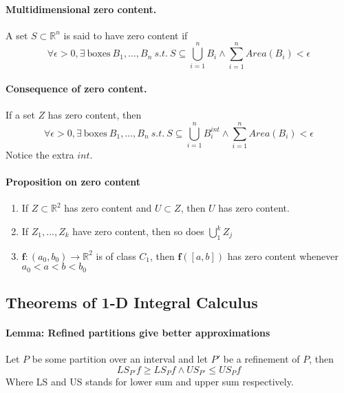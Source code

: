 \documentclass[11pt]{article}
\newcommand{\real}[0]{\mathbb{R}}
\begin{document}
\paragraph{Multidimensional zero content.} A set $S\subset \real^n$ is said to have zero content if
\begin{equation*}
    \forall \epsilon > 0, \exists~\text{boxes}~B_1,...,B_n~s.t.~S\subseteq \bigcup_{i=1}^{n}B_i \wedge \sum_{i=1}^{n}{Area(B_i)} < \epsilon
\end{equation*}

\paragraph{Consequence of zero content.}If a set $Z$ has zero content, then
\begin{equation*}
    \forall \epsilon>0, \exists~\text{boxes}~B_1,...,B_n~s.t.~ S\subseteq \bigcup_{i=1}^{n}B^{int}_i \wedge \sum_{i=1}^{n}{Area(B_i)} < \epsilon
\end{equation*}
Notice the extra $int$.

\paragraph{Proposition on zero content} 
\begin{enumerate}
    \item If $Z\subset \real^2$ has zero content and $U\subset Z$, then $U$ has zero content.
    \item If $Z_1,...,Z_k$ have zero content, then so does $\bigcup_1^k Z_j$
    \item $\mathbf{f}:(a_0, b_0) \xrightarrow{} \real^2$ is of class $C_1$, then $\mathbf{f}([a,b])$ has zero content whenever $a_0<a<b<b_0$
\end{enumerate}
\subsection{Theorems of 1-D Integral Calculus}
\paragraph{Lemma: Refined partitions give better approximations} Let $P$ be some partition over an interval and let $P'$ be a refinement of $P$, then
\begin{equation*}
    LS_{P'}f \geq LS_{P}f \wedge US_{P'} \leq US_{P}f
\end{equation*}
Where LS and US stands for lower sum and upper sum respectively.
\end{document}
